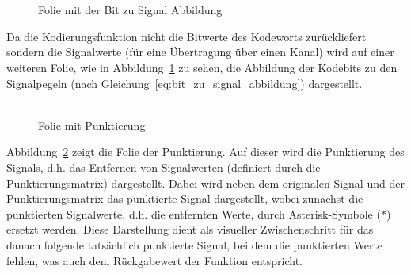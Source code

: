\\
\\
\begin{figure}[t]
	\centering
	\caption{Folie mit der Bit zu Signal Abbildung}
	\label{abb:folie_bit_zu_signal_abbildung}
\end{figure}
Da die Kodierungsfunktion nicht die Bitwerte des Kodeworts zurückliefert sondern die Signalwerte (für eine Übertragung über einen Kanal) wird auf einer weiteren Folie, wie in Abbildung~\ref{abb:folie_bit_zu_signal_abbildung} zu sehen, die Abbildung der Kodebits zu den Signalpegeln (nach Gleichung~\ref{eq:bit_zu_signal_abbildung}) dargestellt.
\\
\\
\begin{figure}[t]
	\centering
	\caption{Folie mit Punktierung}
	\label{abb:folie_punktierung}
\end{figure}
Abbildung~\ref{abb:folie_punktierung} zeigt die Folie der Punktierung. Auf dieser wird die Punktierung des Signals, d.h. das Entfernen von Signalwerten (definiert durch die Punktierungsmatrix) dargestellt. Dabei wird neben dem originalen Signal und der Punktierungsmatrix das punktierte Signal dargestellt, wobei zunächst die punktierten Signalwerte, d.h. die entfernten Werte, durch Asterisk-Symbole ($\ast$) ersetzt werden. Diese Darstellung dient als visueller Zwischenschritt für das danach folgende tatsächlich punktierte Signal, bei dem die punktierten Werte fehlen, was auch dem Rückgabewert der Funktion entspricht.

